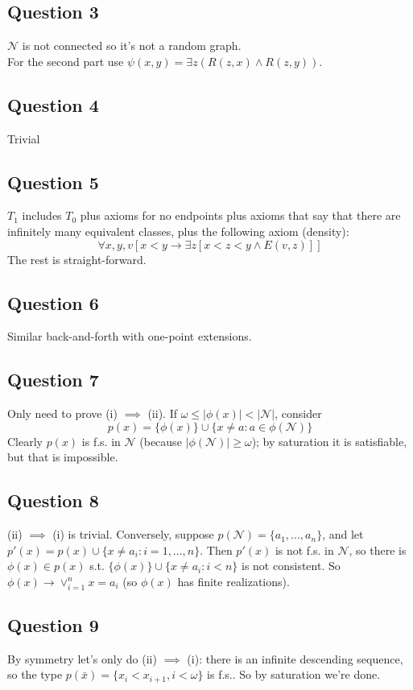 \documentclass[a4paper]{article}
\begin{document}
\subsection{Question 3}
$\mathcal{N}$ is not connected so it's not a random graph.\\
For the second part use $\psi(x,y) = \exists z(R(z,x) \wedge R(z,y))$.

\subsection{Question 4}
Trivial

\subsection{Question 5}
$T_1$ includes $T_0$ plus axioms for no endpoints plus axioms that say that there are infinitely many equivalent classes, plus the following axiom (density):
$$\forall x,y,v[x < y \to \exists z[x < z < y \wedge E(v,z)]]$$
The rest is straight-forward.

\subsection{Question 6}
Similar back-and-forth with one-point extensions.

\subsection{Question 7}
Only need to prove (i) $\implies$ (ii). If $\omega \leq |\phi(x)| < |\mathcal{N}|$, consider 
$$p(x) = \{\phi(x)\} \cup \{x \neq a : a \in \phi(\mathcal{N})\}$$
Clearly $p(x)$ is f.s. in $\mathcal{N}$ (because $|\phi(\mathcal{N})| \geq \omega$); by saturation it is satisfiable, but that is impossible.

\subsection{Question 8}
(ii) $\implies$ (i) is trivial. Conversely, suppose $p(\mathcal{N}) = \{a_1,...,a_n\}$, and let $p'(x) = p(x) \cup \{x \neq a_i:i=1,...,n\}$. Then $p'(x)$ is not f.s. in $\mathcal{N}$, so there is $\phi(x) \in p(x)$ s.t. $\{\phi(x)\} \cup \{x \neq a_i: i<n\}$ is not consistent. So $\phi(x) \to \vee_{i=1}^n x=a_i$ (so $\phi(x)$ has finite realizations).

\subsection{Question 9}
By symmetry let's only do (ii) $\implies$ (i): there is an infinite descending sequence, so the type $p(\bar{x}) = \{x_i<x_{i+1}, i < \omega\}$ is f.s.. So by saturation we're done.
\end{document}
